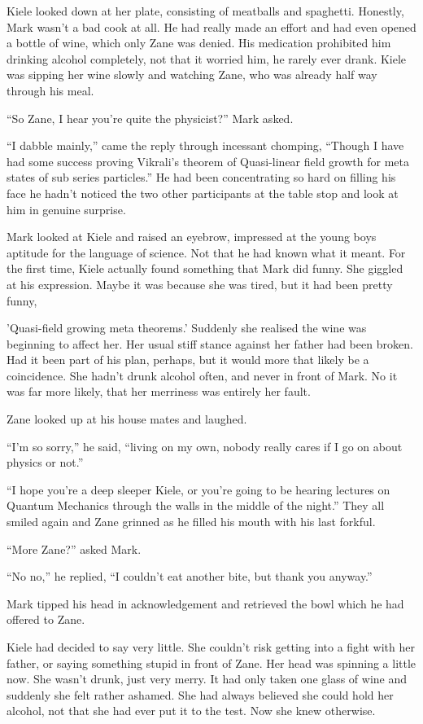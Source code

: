 Kiele looked down at her plate, consisting of meatballs and spaghetti.  Honestly, Mark wasn't a bad cook at all.  He had really made an effort and had even opened a bottle of wine, which only Zane was denied.  His medication prohibited him drinking alcohol completely, not that it worried him, he rarely ever drank.  Kiele was sipping her wine slowly and watching Zane, who was already half way through his meal.

``So Zane, I hear you're quite the physicist?'' Mark asked.

``I dabble mainly,'' came the reply through incessant chomping, ``Though I have had some success proving Vikrali's theorem of Quasi-linear field growth for meta states of sub series particles.''  He had been concentrating so hard on filling his face he hadn't noticed the two other participants at the table stop and look at him in genuine surprise.

Mark looked at Kiele and raised an eyebrow, impressed at the young boys aptitude for the language of science.  Not that he had known what it meant.  For the first time, Kiele actually found something that Mark did funny.  She giggled at his expression.  Maybe it was because she was tired, but it had been pretty funny, 

'Quasi-field growing meta theorems.'  Suddenly she realised the wine was beginning to affect her.  Her usual stiff stance against her father had been broken.  Had it been part of his plan, perhaps, but it would more that likely be a coincidence.  She hadn't drunk alcohol often, and never in front of Mark.  No it was far more likely, that her merriness was entirely her fault.

Zane looked up at his house mates and laughed.  

``I'm so sorry,'' he said, ``living on my own, nobody really cares if I go on about physics or not.''  

``I hope you're a deep sleeper Kiele, or you're going to be hearing lectures on Quantum Mechanics through the walls in the middle of the night.''  They all smiled again and Zane grinned as he filled his mouth with his last forkful.

``More Zane?'' asked Mark.

``No no,'' he replied, ``I couldn't eat another bite, but thank you anyway.''

Mark tipped his head in acknowledgement and retrieved the bowl which he had offered to Zane.

Kiele had decided to say very little.  She couldn't risk getting into a fight with her father, or saying something stupid in front of Zane.  Her head was spinning a little now.  She wasn't drunk, just very merry.  It had only taken one glass of wine and suddenly she felt rather ashamed.  She had always believed she could hold her alcohol, not that she had ever put it to the test.  Now she knew otherwise.

